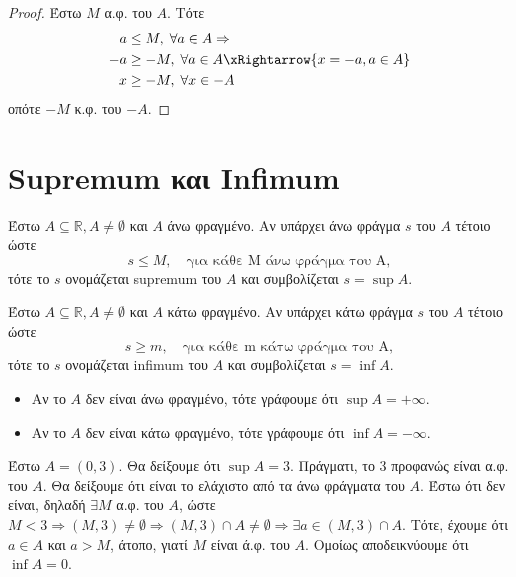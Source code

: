 \documentclass[main.tex]{subfiles}
\begin{document}
\begin{proof}
    Έστω $M$ α.φ. του $A$. Τότε 
    \begin{align*}
        a &\leq M, \; \forall a \in A \Rightarrow  \\
        -a &\geq -M, \; \forall a \in A \xRightarrow{x= -a, a \in A} \\
        x &\geq -M, \; \forall x \in -A
    \end{align*}
    οπότε $ -M $  κ.φ. του $ -A $.
\end{proof}

\section{Supremum και Infimum}

\begin{dfn}
    Έστω $ A \subseteq \mathbb{R}, A \neq \emptyset $ και $A$ άνω 
    φραγμένο. Αν υπάρχει άνω φράγμα $s$ του $A$ τέτοιο ώστε 
    \[
        s \leq M, \quad \text{για κάθε M άνω φράγμα του A}, 
    \] 
    τότε το $s$ ονομάζεται supremum του $A$ και συμβολίζεται $ s=\sup A $.
\end{dfn}

\begin{dfn}
    Έστω $ A \subseteq \mathbb{R}, A \neq \emptyset $ και $A$ κάτω 
    φραγμένο. Αν υπάρχει κάτω φράγμα $s$ του $A$ τέτοιο ώστε 
    \[
       s \geq m, \quad \text{για κάθε m κάτω φράγμα του A}, 
    \] 
    τότε το $s$ ονομάζεται infimum του $A$ και συμβολίζεται $ s=\inf A $.
\end{dfn}

\begin{rem}
\item {}
    \begin{itemize}
        \item Αν το $A$ δεν είναι άνω φραγμένο, τότε γράφουμε ότι $ \sup A = 
            + \infty $.
        \item Αν το $A$ δεν είναι κάτω φραγμένο, τότε γράφουμε ότι $ \inf A = 
            - \infty $.
    \end{itemize}
\end{rem}

\begin{example}
    Έστω $ A = (0,3) $. Θα δείξουμε ότι $ \sup A = 3 $. Πράγματι, 
    το $ 3 $ προφανώς είναι α.φ. του $A$. Θα δείξουμε ότι είναι το
    ελάχιστο από τα άνω φράγματα του $A$. Έστω ότι δεν είναι, δηλαδή 
    $ \exists M $ α.φ. του $A$, ώστε $ M < 3 \Rightarrow (M,3) \neq 
    \emptyset \Rightarrow (M,3) \cap A \neq \emptyset \Rightarrow \exists 
    a \in (M,3) \cap A $. Τότε, έχουμε ότι $ a \in A $ και $ a > M $, 
    άτοπο, γιατί $M$ είναι ά.φ. του $A$. Ομοίως αποδεικνύουμε ότι $ 
    \inf A = 0$.
\end{example}
\end{document}
